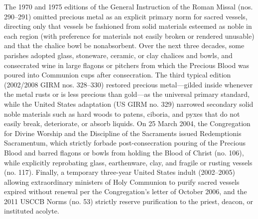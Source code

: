 \PCDEntryRule

\label{pc-obj-hist-fragile-vessels-pouring}
The 1970 and 1975 editions of the General Instruction of the Roman Missal (nos. 290--291) omitted precious metal as an explicit primary norm for sacred vessels, directing only that vessels be fashioned from solid materials esteemed as noble in each region (with preference for materials not easily broken or rendered unusable) and that the chalice bowl be nonabsorbent. Over the next three decades, some parishes adopted glass, stoneware, ceramic, or clay chalices and bowls, and consecrated wine in large flagons or pitchers from which the Precious Blood was poured into Communion cups after consecration. The third typical edition (2002/2008 GIRM nos. 328--330) restored precious metal---gilded inside whenever the metal rusts or is less precious than gold---as the universal primary standard, while the United States adaptation (US GIRM no. 329) narrowed secondary solid noble materials such as hard woods to patens, ciboria, and pyxes that do not easily break, deteriorate, or absorb liquids. On 25 March 2004, the Congregation for Divine Worship and the Discipline of the Sacraments issued Redemptionis Sacramentum, which strictly forbade post-consecration pouring of the Precious Blood and barred flagons or bowls from holding the Blood of Christ (no. 106), while explicitly reprobating glass, earthenware, clay, and fragile or rusting vessels (no. 117). Finally, a temporary three-year United States indult (2002--2005) allowing extraordinary ministers of Holy Communion to purify sacred vessels expired without renewal per the Congregation's letter of October 2006, and the 2011 USCCB Norms (no. 53) strictly reserve purification to the priest, deacon, or instituted acolyte.

